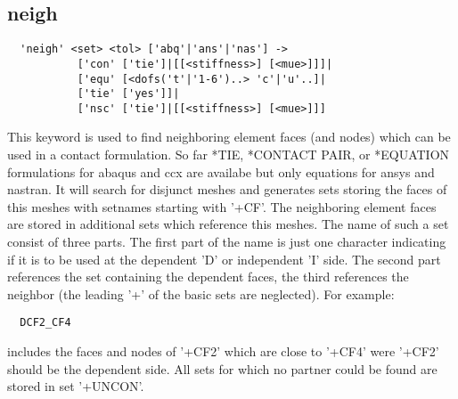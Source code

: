 \documentclass{article}
\begin{document}
\subsection{\label{neigh}neigh}
\begin{verbatim}
  'neigh' <set> <tol> ['abq'|'ans'|'nas'] ->
           ['con' ['tie']|[[<stiffness>] [<mue>]]]|
           ['equ' [<dofs('t'|'1-6')..> 'c'|'u'..]|
           ['tie' ['yes']]|
           ['nsc' ['tie']|[[<stiffness>] [<mue>]]]
\end{verbatim}
This keyword is used to find neighboring element faces (and nodes) which can be used in a contact formulation. So far *TIE, *CONTACT PAIR, or *EQUATION formulations for abaqus and ccx are availabe but only equations for ansys and nastran. It will search for disjunct meshes and generates sets storing the faces of this meshes with setnames starting with '+CF'. The neighboring element faces are stored in additional sets which reference this meshes. The name of such a set consist of three parts. The first part of the name is just one character indicating if it is to be used at the dependent 'D' or independent 'I' side. The second part references the set containing the dependent faces, the third references the neighbor (the leading '+' of the basic sets are neglected). For example:
\begin{verbatim}
  DCF2_CF4
\end{verbatim}
includes the faces and nodes of '+CF2' which are close to '+CF4' were '+CF2' should be the dependent side. All sets for which no partner could be found are stored in set '+UNCON'. 
\end{document}
